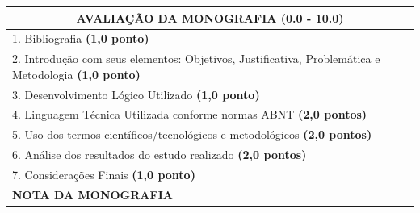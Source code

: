 \renewcommand{\sizeA}{0.750\textwidth}
\renewcommand{\sizeB}{0.185\textwidth}
\begin{table}[!ht]
    \centering
    \begin{tabular}{|p{\sizeA}|p{\sizeB}|}
    \hline        
        \multicolumn{2}{|c|}{\parbox[c][\sizeC][c]{0.9\textwidth}{\centering\textbf{AVALIAÇÃO DA MONOGRAFIA (0.0 - 10.0)}}}  \\ \hline
        
        \parbox[c][\sizeC][c]{\sizeA}{1. Bibliografia \textbf{(1,0 ponto)}} & \parbox[c][\sizeC][c]{\sizeB}{}     \\ \hline        
        
        \parbox[c][\sizeC][c]{\sizeA}{2. Introdução com seus elementos: Objetivos, Justificativa, Problemática e Metodologia \textbf{(1,0 ponto)}} & \parbox[c][\sizeC][c]{\sizeB}{}     \\ \hline     
        
        \parbox[c][\sizeC][c]{\sizeA}{3. Desenvolvimento Lógico Utilizado \textbf{(1,0 ponto)}} & \parbox[c][\sizeC][c]{\sizeB}{}     \\ \hline        

        \parbox[c][\sizeC][c]{\sizeA}{4. Linguagem Técnica Utilizada conforme normas ABNT  \textbf{(2,0 pontos)}} & \parbox[c][\sizeC][c]{\sizeB}{}     \\ \hline        
        
        \parbox[c][\sizeC][c]{\sizeA}{5. Uso dos termos científicos/tecnológicos e metodológicos \textbf{(2,0 pontos)}} & \parbox[c][\sizeC][c]{\sizeB}{}     \\ \hline        

        \parbox[c][\sizeC][c]{\sizeA}{6. Análise dos resultados do estudo realizado \textbf{(2,0 pontos)}} & \parbox[c][\sizeC][c]{\sizeB}{}     \\ \hline        

        \parbox[c][\sizeC][c]{\sizeA}{7. Considerações Finais \textbf{(1,0 ponto)}} & \parbox[c][\sizeC][c]{\sizeB}{}     \\ \hline        
        
        \parbox[c][\sizeC][c]{\sizeA}{\centering\textbf{NOTA DA MONOGRAFIA}} & \parbox[c][\sizeC][c]{\sizeB}{}     \\ %
        
    \hline
    \end{tabular}
\end{table}%

